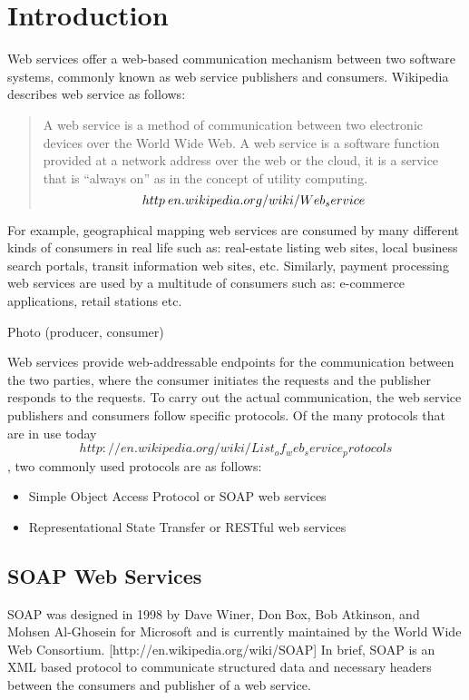 \documentclass[runningheads,a4paper]{llncs}
\begin{document}
\section{Introduction}

Web services offer a web-based communication mechanism between two software systems, commonly known as web service publishers and consumers. Wikipedia describes web service as follows:

\begin{quote}
A web service is a method of communication between two electronic devices over the World Wide Web. A web service is a software function provided at a network address over the web or the cloud, it is a service that is ``always on'' as in the concept of utility computing. \[http\:\/\/en.wikipedia.org/wiki/Web_service\]
\end{quote}

For example, geographical mapping web services are consumed by many different kinds of consumers in real life such as: real-estate listing web sites, local business search portals, transit information web sites, etc. Similarly, payment processing web services are used by a multitude of consumers such as: e-commerce applications, retail stations etc.

Photo (producer, consumer)


Web services provide web-addressable endpoints for the communication between the two parties, where the consumer initiates the requests and the publisher responds to the requests. To carry out the actual communication, the web service publishers and consumers follow specific protocols. Of the many protocols that are in use today \[http://en.wikipedia.org/wiki/List_of_web_service_protocols\], two commonly used protocols are as follows:

\begin{itemize}
  \item Simple Object Access Protocol or SOAP web services
  \item Representational State Transfer or RESTful web services
\end{itemize}


\subsection{SOAP Web Services} %
\label{sub:soap_web_services}
SOAP was designed in 1998 by Dave Winer, Don Box, Bob Atkinson, and Mohsen Al-Ghosein for Microsoft and is currently maintained by the World Wide Web Consortium. [http://en.wikipedia.org/wiki/SOAP] In brief, SOAP is an XML based protocol to communicate structured data and necessary headers between the consumers and publisher of a web service.
\end{document}

